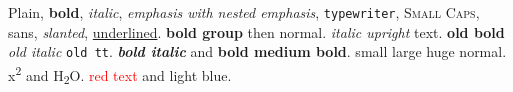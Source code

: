 \documentclass{article}
\begin{document}
Plain, \textbf{bold}, \textit{italic}, \emph{emphasis with \emph{nested} emphasis},
\texttt{typewriter}, \textsc{Small Caps}, \textsf{sans}, \textsl{slanted}, \underline{underlined}.
{\bfseries bold group} then normal. {\itshape italic \upshape upright} text.
{\bf old bold} {\it old italic} {\tt old tt}.
\textbf{\textit{bold italic}} and \textbf{bold \textmd{medium} bold}.
{\small small} {\large large} {\Huge huge} \normalsize normal.
x\textsuperscript{2} and H\textsubscript{2}O.
\textcolor{red}{red text} and {\color{blue!50} light blue}.
\end{document}
